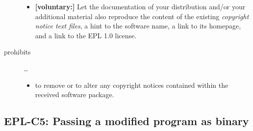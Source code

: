 \begin{description}
\begin{itemize}
  \item \textbf{[voluntary:]} Let the documentation of your distribution and/or
  your additional material also reproduce the content of the existing
  \emph{copyright notice text files}, a hint to the software name, a link to its
  homepage, and a link to the EPL 1.0 license.
  
 \end{itemize}
 
\item[prohibits] \ldots
\begin{itemize}
  \item to remove or to alter any copyright notices contained within the
  received software package.
\end{itemize}

\end{description}

\subsection{EPL-C5: Passing a modified program as binary}
\label{OSUC-04B-EPL}

